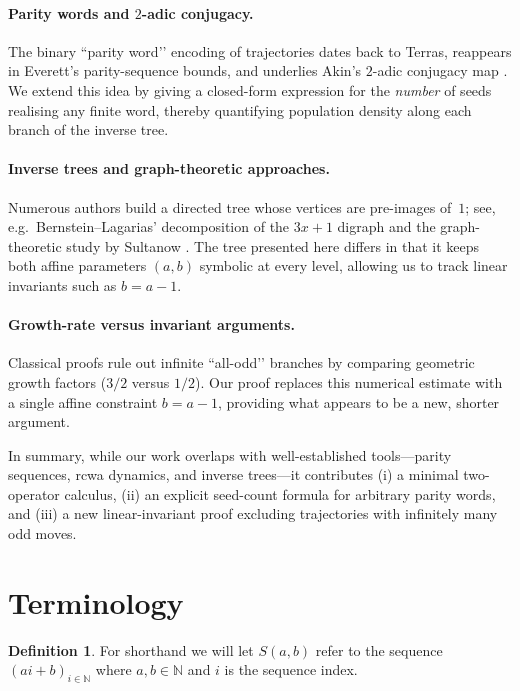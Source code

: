 \documentclass{article}
\theoremstyle{definition}
\newtheorem{definition}{Definition}[section]
\begin{document}
\paragraph{Parity words and \(2\)-adic conjugacy.}
The binary “parity word’’ encoding of trajectories dates back to Terras,
reappears in Everett’s parity-sequence bounds, and underlies Akin’s \(2\)-adic
conjugacy map \cite{Akin2004}\cite{LagariasOverview2021}.  We extend
this idea by giving a closed-form expression for the \emph{number} of seeds
realising any finite word, thereby quantifying population density along each
branch of the inverse tree.

\paragraph{Inverse trees and graph-theoretic approaches.}
Numerous authors build a directed tree whose vertices are pre-images of~\(1\);
see, e.g.\ Bernstein–Lagarias’ decomposition of the \(3x+1\) digraph and the
graph-theoretic study by Sultanow \cite{Sultanow2020}.  The tree presented
here differs in that it keeps both affine parameters \((a,b)\) symbolic at
every level, allowing us to track linear invariants such as \(b=a-1\).

\paragraph{Growth-rate versus invariant arguments.}
Classical proofs rule out infinite “all-odd’’ branches by comparing
geometric growth factors (\(3/2\) versus \(1/2\)).  Our proof replaces this
numerical estimate with a single affine constraint \(b=a-1\), providing what
appears to be a new, shorter argument.

\medskip
\noindent
In summary, while our work overlaps with well-established tools—parity sequences,
rcwa dynamics, and inverse trees—it contributes (i) a minimal two-operator
calculus, (ii) an explicit seed-count formula for arbitrary parity words, and
(iii) a new linear-invariant proof excluding trajectories with infinitely many
odd moves.

\section{Terminology}

\begin{definition}
For shorthand we will let $S(a,b)$ refer to the sequence $ (ai+b)_{i\in\mathbb{N}}$ where $a,b\in \mathbb{N}$ and $i$ is the sequence index.
\end{definition}
\end{document}
